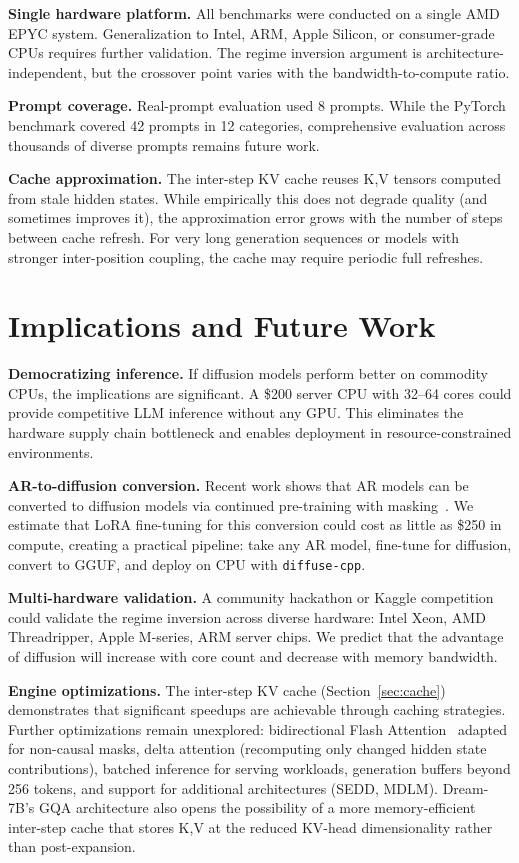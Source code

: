 \documentclass[11pt]{article}
\begin{document}
\textbf{Single hardware platform.} All benchmarks were conducted on a single AMD EPYC
system. Generalization to Intel, ARM, Apple Silicon, or consumer-grade CPUs requires
further validation. The regime inversion argument is architecture-independent, but the
crossover point varies with the bandwidth-to-compute ratio.

\textbf{Prompt coverage.} Real-prompt evaluation used 8 prompts. While the PyTorch
benchmark covered 42 prompts in 12 categories, comprehensive evaluation across thousands
of diverse prompts remains future work.

\textbf{Cache approximation.} The inter-step KV cache reuses K,V tensors computed from
stale hidden states. While empirically this does not degrade quality (and sometimes
improves it), the approximation error grows with the number of steps between cache
refresh. For very long generation sequences or models with stronger inter-position
coupling, the cache may require periodic full refreshes.


\section{Implications and Future Work}

\textbf{Democratizing inference.} If diffusion models perform better on commodity CPUs,
the implications are significant. A \$200 server CPU with 32--64 cores could provide
competitive LLM inference without any GPU. This eliminates the hardware supply chain
bottleneck and enables deployment in resource-constrained environments.

\textbf{AR-to-diffusion conversion.} Recent work shows that AR models can be converted
to diffusion models via continued pre-training with masking~\cite{nie2025}. We estimate
that LoRA fine-tuning for this conversion could cost as little as \$250 in compute,
creating a practical pipeline: take any AR model, fine-tune for diffusion, convert to
GGUF, and deploy on CPU with \texttt{diffuse-cpp}.

\textbf{Multi-hardware validation.} A community hackathon or Kaggle competition could
validate the regime inversion across diverse hardware: Intel Xeon, AMD Threadripper,
Apple M-series, ARM server chips. We predict that the advantage of diffusion will
increase with core count and decrease with memory bandwidth.

\textbf{Engine optimizations.} The inter-step KV cache (Section~\ref{sec:cache})
demonstrates that significant speedups are achievable through caching strategies.
Further optimizations remain unexplored: bidirectional Flash Attention~\cite{dao2022}
adapted for non-causal masks, delta attention (recomputing only changed hidden state
contributions), batched inference for serving workloads, generation buffers beyond 256
tokens, and support for additional architectures (SEDD, MDLM). Dream-7B's GQA
architecture also opens the possibility of a more memory-efficient inter-step cache
that stores K,V at the reduced KV-head dimensionality rather than post-expansion.
\end{document}
